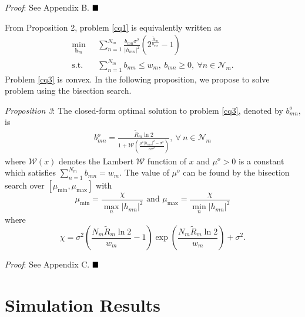\documentclass[journal]{IEEEtran}
\begin{document}
\textit{Proof}: See Appendix B. $\hfill\blacksquare$

From Proposition 2, problem \eqref{cq1} is equivalently written as
\begin{align}\label{cq3}
\min_{\mathbf{b}_{m}}\ & \sum\limits_{n= 1}^{N_m} \frac{b_{mn}\sigma^2}{\left|h_{mn}\right|^2}\left(2^{\frac{\tilde{R}_m}{b_{mn}}} - 1\right) \nonumber \\ \mbox{s.t.} \quad &  \sum\limits_{n=1}^{N_m} b_{mn} \leq w_m,\ b_{mn} \geq 0,\ \forall n\in\mathcal{N}_m.
\end{align}
Problem \eqref{cq3} is convex. In the following proposition, we propose to solve problem using the bisection search.

\textit{Proposition 3}: The closed-form optimal solution to problem \eqref{cq3}, denoted by $b_{mn}^o$, is
\begin{align}\label{cq4}
b_{mn}^o= \frac{\tilde{R}_m\ln2}{1 + \mathcal{W}\left(\frac{\mu^o\left|h_{mn}\right|^2 - \sigma^2}{e\sigma^2}\right)},\ \forall\ n\in\mathcal{N}_m
\end{align}
where $\mathcal{W}\left(x\right)$ denotes the Lambert $\mathcal{W}$ function of $x$ \cite{RMCorless} and $\mu^o>0$ is a constant which satisfies $\sum_{n=1}^{N_m} b_{mn}=w_m$. The value of $\mu^o$ can be found by the bisection search over $\left[\mu_{\min}, \mu_{\max}\right]$ with
\begin{equation}\label{cq5}
\mu_{\min}=\frac{\chi}{\max_n\left|h_{mn}\right|^2} \mbox{ and } \mu_{\max}=\frac{\chi}{\min_n\left|h_{mn}\right|^2}
\end{equation}
where
\begin{equation}
\chi=\sigma^2\left(\frac{N_m\tilde{R}_m\ln2}{w_m} - 1\right)\exp\left(\frac{N_m\tilde{R}_m\ln2}{w_m}\right) + \sigma^2.
\end{equation}

\textit{Proof}: See Appendix C.  $\hfill\blacksquare$

\section{Simulation Results}
\end{document}

